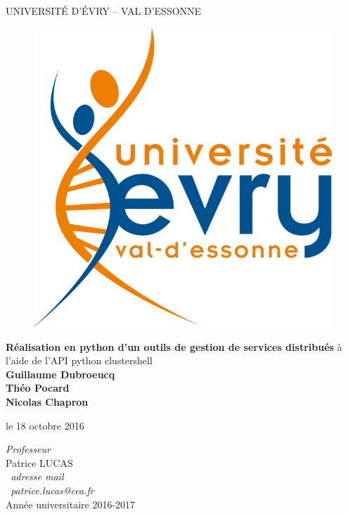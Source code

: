 \documentclass[a4paper,11pt]{article}
\begin{document}
\renewcommand{\refname}{Bibliographie}



\thispagestyle{empty}
\begin{center}
	 {\LARGE UNIVERSITÉ D'ÉVRY -- VAL D'ESSONNE}
	 
\vskip 10mm	 
	 \begin{figure}[H]
		\centerline{\includegraphics[scale=0.4]{logoUEVE.png}}

	\end{figure}

  \vfill {\huge {\bf Réalisation en python d'un outils de gestion de services distribués}} 
  \vskip 1mm
 à l'aide de l'API python clustershell\\
  
  \vskip 3mm {\LARGE {\bf Guillaume Dubroeucq}} 
  \\ \LARGE {\bf Théo Pocard}
  \\ \LARGE {\bf Nicolas Chapron}
  
  \vskip 3mm le 18 octobre 2016
  \vfill
 
  \emph{Professeur}\\
  Patrice LUCAS\\
  \emph{\ adresse mail}\\
	\emph{\ patrice.lucas@cea.fr}\\
  \vskip 3cm Année universitaire 2016-2017
\end{center}
\end{document}
